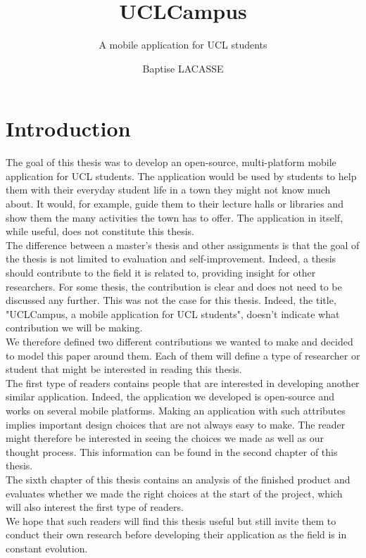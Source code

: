 \documentclass{eplmastersthesis}
\title{UCLCampus}	%
\subtitle{A mobile application for UCL students}			%
\author{Baptise \textsc{LACASSE}}	%
\begin{document}
\renewcommand\thepage{}
\maketitle					%
\thispagestyle{empty}		%
\tableofcontents %
\newpage %
\linespread{1.2} %
\renewcommand\thepage{\arabic{page}}

\chapter{Introduction} %

The goal of this thesis was to develop an open-source, multi-platform mobile application for UCL students. The application would be used by students to help them with their everyday student life in a town they might not know much about. It would, for example, guide them to their lecture halls or libraries and show them the many activities the town has to offer. The application in itself, while useful, does not constitute this thesis.\\

The difference between a master's thesis and other assignments is that the goal of the thesis is not limited to evaluation and self-improvement. Indeed, a thesis should contribute to the field it is related to, providing insight for other researchers. For some thesis, the contribution is clear and does not need to be discussed any further. This was not the case for this thesis. Indeed, the title, "UCLCampus, a mobile application for UCL students", doesn't indicate what contribution we will be making.\\

 We therefore defined two different contributions we wanted to make and decided to model this paper around them. Each of them will define a type of researcher or student that might be interested in reading this thesis.\\

The first type of readers contains people that are interested in developing another similar application. Indeed, the application we developed is open-source and works on several mobile platforms. Making an application with such attributes implies important design choices that are not always easy to make. The reader might therefore be interested in seeing the choices we made as well as our thought process. This information can be found in the second chapter of this thesis.\\
The sixth chapter of this thesis contains an analysis of the finished product and evaluates whether we made the right choices at the start of the project, which will also interest the first type of readers.\\
We hope that such readers will find this thesis useful but still invite them to conduct their own research before developing their application as the field is in constant evolution.\\
\end{document}
